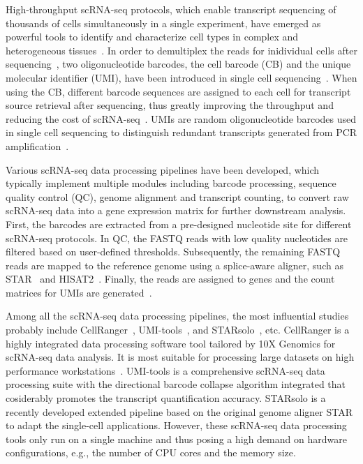 \documentclass[conference]{IEEEtran}
\begin{document}
High-throughput scRNA-seq protocols, which enable transcript sequencing of thousands of cells simultaneously in a single experiment, have emerged as powerful tools to identify and characterize cell types in complex and heterogeneous tissues~\cite{Zhang2019ComparativeAO}.
In order to demultiplex the reads for inidividual cells after sequencing~\cite{Tian2018scPipe}, two oligonucleotide barcodes, the cell barcode (CB) and the unique molecular identifier (UMI), have been introduced in single cell sequencing~\cite{Rosenberg2018SinglecellPO,Cao2017ComprehensiveSC}. 
When using the CB, different barcode sequences are assigned to each cell for transcript source retrieval after sequencing, thus greatly improving the throughput and reducing the cost of scRNA-seq~\cite{Macosko2015HighlyPG,Klein2015DropletBF}. 
UMIs are random oligonucleotide barcodes used in single cell sequencing to distinguish redundant transcripts generated from PCR amplification~\cite{Kivioja2012Counting,Camara2017Methods,Smith2017UMItools}. 

Various scRNA-seq data processing pipelines have been developed, which typically implement multiple modules including barcode processing, sequence quality control (QC), genome alignment and transcript counting, to convert raw scRNA-seq data into a gene expression matrix for further downstream analysis. 
First, the barcodes are extracted from a pre-designed nucleotide site for different scRNA-seq protocols. 
In QC, the FASTQ reads with low quality nucleotides are filtered based on user-defined thresholds. 
Subsequently, the remaining FASTQ reads are mapped to the reference genome using a splice-aware aligner, such as STAR~\cite{Dobin2013STAR} and HISAT2~\cite{Kim2015HISAT}. 
Finally, the reads are assigned to genes and the count matrices for UMIs are generated~\cite{Parekh2018zUMIs}. 

Among all the scRNA-seq data processing pipelines, the most influential studies probably include CellRanger~\cite{Zheng2017Massively}, UMI-tools~\cite{Smith2017UMItools}, and STARsolo~\cite{Blibaum2019STARsolo}, etc. 
CellRanger is a highly integrated data processing software tool tailored by 10X Genomics for scRNA-seq data analysis. It is most suitable for processing large datasets on high performance workstations~\cite{Gao2020Comparison}. 
UMI-tools is a comprehensive scRNA-seq data processing suite with the directional barcode collapse algorithm integrated that cosiderably promotes the transcript quantification accuracy.
STARsolo is a recently developed extended pipeline based on the original genome aligner STAR to adapt the single-cell applications. 
However, these scRNA-seq data processing tools only run on a single machine and thus posing a high demand on hardware configurations, e.g., the number of CPU cores and the memory size. 
\end{document}
